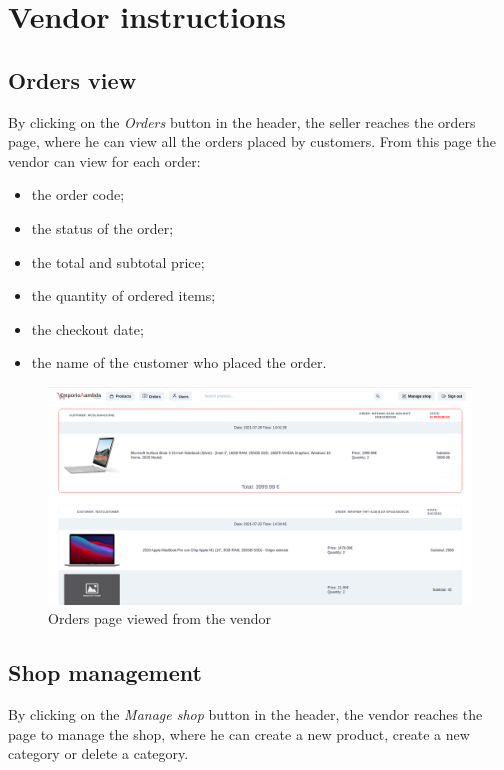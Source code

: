 \section{Vendor instructions}
\subsection{Orders view}
By clicking on the \textit{Orders} button in the header, the seller reaches the orders page, where he can view all the orders placed by customers.
\newline
From this page the vendor can view for each order:
\begin {itemize}
\item the order code;
\item the status of the order;
\item the total and subtotal price;
\item the quantity of ordered items;
\item the checkout date;
\item the name of the customer who placed the order.
\end {itemize}
\begin{figure}[!ht]
    \caption{Orders page viewed from the vendor}
    \vspace{5px}
    \includegraphics[scale=0.25]{../../../../Images/userManual/ordersVendor.png}
    \centering
\end{figure}
\pagebreak
\subsection{Shop management}
By clicking on the \textit{Manage shop} button in the header, the vendor reaches the page to manage the shop, where he can create a new product, create a new category or delete a category.
